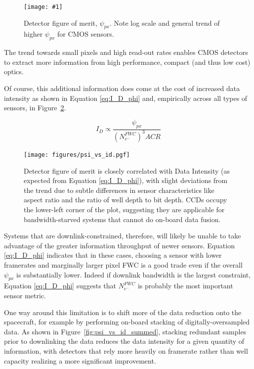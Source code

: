 \documentclass[10pt,journal]{IEEEtran}  %
\newcommand{\includefigure}[3]
{
  \begin{figure}[h!]
  \centering
  \texttt{[image: \#1]}
  \caption[]{#3}
  \label{#2}
  \end{figure}
}
\begin{document}
\includefigure{figures/p_kpi.pgf}{fig:psi_px}{Detector figure of merit, $\psi_{px}$.  Note log scale and general trend of higher $\psi_{px}$ for CMOS sensors.}

\begin{observation}
The trend towards small pixels and high read-out rates enables CMOS detectors to extract more information from high performance, compact (and thus low cost) optics.
\end{observation}

Of course, this additional information does come at the cost of increased data intensity as shown in Equation \eqref{eq:I_D_phi} and, empirically across all types of sensors, in Figure~\ref{fig:psi_vs_id}.

\begin{equation}
\label{eq:I_D_phi}
    I_D \propto \frac{\psi_{px}}{\left(N_{e^-}^{FWC}\right)^3 ACR}
\end{equation}

\begin{figure}
  \texttt{[image: figures/psi\_vs\_id.pgf]}
  \caption{Detector figure of merit is closely correlated with Data Intensity (as expected from Equation \eqref{eq:I_D_phi}), with slight deviations from the trend due to subtle differences in sensor characteristics like aspect ratio and the ratio of well depth to bit depth. CCDs occupy the lower-left corner of the plot, suggesting they are applicable for bandwidth-starved systems that cannot do on-board data fusion.
  \label{fig:psi_vs_id}}
\end{figure}

Systems that are downlink-constrained, therefore, will likely be unable to take advantage of the greater information throughput of newer sensors. Equation \eqref{eq:I_D_phi}  indicates that in these cases, choosing a sensor with lower framerates and marginally larger pixel FWC is a good trade even if the overall $\psi_{px}$ is substantially lower.  Indeed if downlink bandwidth is the largest constraint, Equation \eqref{eq:I_D_phi} suggests that $N_{e^-}^{FWC}$ is probably the most important sensor metric.

One way around this limitation is to shift more of the data reduction onto the spacecraft, for example by performing on-board stacking of digitally-oversampled data. As shown in Figure~\ref{fig:psi_vs_id_summed}, stacking redundant samples prior to downlinking the data reduces the data intensity for a given quantity of information, with detectors that rely more heavily on framerate rather than well capacity realizing a more significant improvement.
\end{document}
